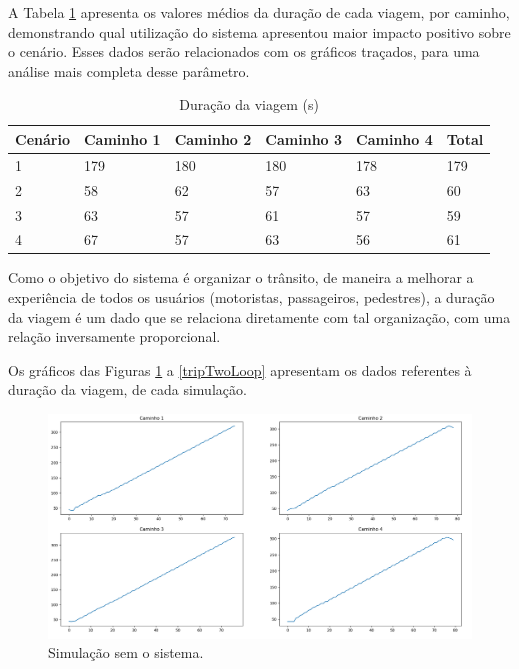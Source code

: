 A Tabela \ref{tab: duration} apresenta os valores médios da duração de cada viagem, por caminho, demonstrando qual utilização do sistema apresentou maior impacto positivo sobre o cenário. Esses dados serão relacionados com os gráficos traçados, para uma análise mais completa desse parâmetro.

\begin{table}[H]
\centering
\caption{Duração da viagem (s)}
\label{tab: duration}
\begin{tabular}{@{}llllll@{}}
\toprule
Cenário & Caminho 1 & Caminho 2 & Caminho 3 & Caminho 4 & Total \\ \midrule
1 & 179 & 180 & 180 & 178 & 179 \\
2 & 58 & 62 & 57 & 63 & 60 \\
3 &	63 & 57 & 61 & 57 & 59 \\
4 & 67 & 57 & 63 & 56 & 61 \\
\bottomrule
\end{tabular}
\end{table}

Como o objetivo do sistema é organizar o trânsito, de maneira a melhorar a experiência de todos os usuários (motoristas, passageiros, pedestres), a duração da viagem é um dado que se relaciona diretamente com tal organização, com uma relação inversamente proporcional.

Os gráficos das Figuras \ref{tripNoTL} a \ref{tripTwoLoop} apresentam os dados referentes à duração da viagem, de cada simulação. 

\begin{figure}[H]
    \begin{center}
    \includegraphics[width=1\textwidth]{figuras/Trip_Duration_No_TrafficLight.PNG}
    \end{center}
    \caption[Duração da viagem, cenário 1]{Simulação sem o sistema.}
    \label{tripNoTL}
\end{figure}


